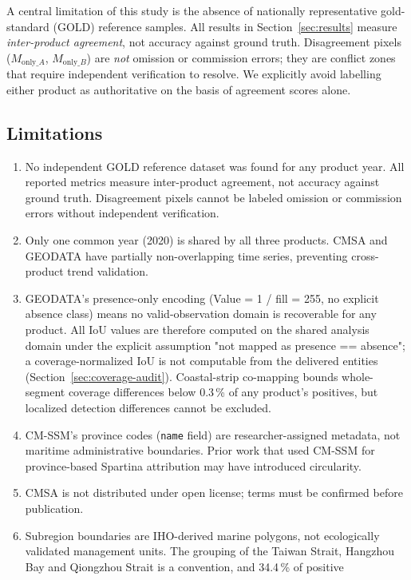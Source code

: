 \documentclass[11pt]{article}
\begin{document}
A central limitation of this study is the absence of nationally representative
gold-standard (GOLD) reference samples. All results in Section~\ref{sec:results}
measure \emph{inter-product agreement}, not accuracy against ground truth.
Disagreement pixels ($M_{\text{only}\_A}$, $M_{\text{only}\_B}$) are \emph{not}
omission or commission errors; they are conflict zones that require independent
verification to resolve. We explicitly avoid labelling either product as
authoritative on the basis of agreement scores alone.

\subsection{Limitations}

\begin{enumerate}[nosep]
\item No independent GOLD reference dataset was found for any product year.
  All reported metrics measure inter-product agreement, not accuracy against
  ground truth. Disagreement pixels cannot be labeled omission or commission
  errors without independent verification.
\item Only one common year (2020) is shared by all three products. CMSA and
  GEODATA have partially non-overlapping time series, preventing cross-product
  trend validation.
\item GEODATA's presence-only encoding (Value = 1 / fill = 255, no explicit
  absence class) means no valid-observation domain is recoverable for any
  product. All IoU values are therefore computed on the shared analysis
  domain under the explicit assumption "not mapped as presence == absence";
  a coverage-normalized IoU is not computable from the delivered entities
  (Section~\ref{sec:coverage-audit}). Coastal-strip co-mapping bounds
  whole-segment coverage differences below 0.3\,\% of any product's
  positives, but localized detection differences cannot be excluded.
\item CM-SSM's province codes (\texttt{name} field) are researcher-assigned
  metadata, not maritime administrative boundaries. Prior work that used CM-SSM
  for province-based Spartina attribution may have introduced circularity.
\item CMSA is not distributed under open license; terms must be confirmed
  before publication.
\item Subregion boundaries are IHO-derived marine polygons, not
  ecologically validated management units. The grouping of the Taiwan Strait,
  Hangzhou Bay and Qiongzhou Strait is a convention, and 34.4\,\% of positive

\end{enumerate}
\end{document}
